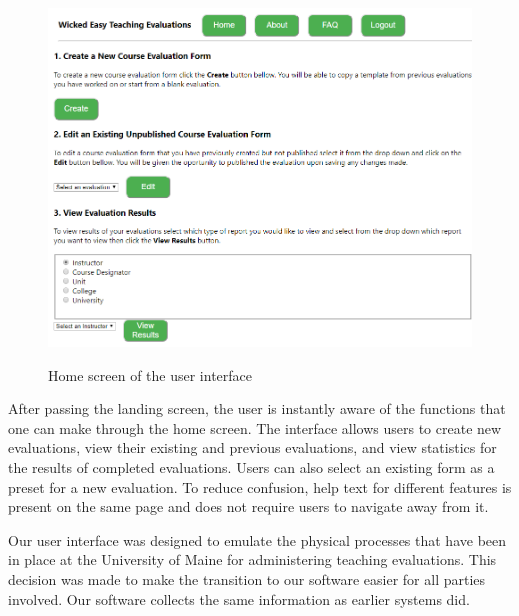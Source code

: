 \documentclass{article}
\begin{document}
\begin{center}
\begin{figure}[H]
    \centering
    {\includegraphics[scale=.6]{images/homeScreen.png}}
    \caption{Home screen of the user interface}
\end{figure}
\end{center}

After passing the landing screen, the user is instantly aware of the functions that one can make through the home screen. The interface allows users to create new evaluations, view their existing and previous evaluations, and view statistics for the results of completed evaluations. Users can also select an existing form as a preset for a new evaluation. To reduce confusion, help text for different features is present on the same page and does not require users to navigate away from it.

\newpage

Our user interface was designed to emulate the physical processes that have been in place at the University of Maine for administering teaching evaluations. This decision was made to make the transition to our software easier for all parties involved. Our software collects the same information as earlier systems did.
\end{document}
